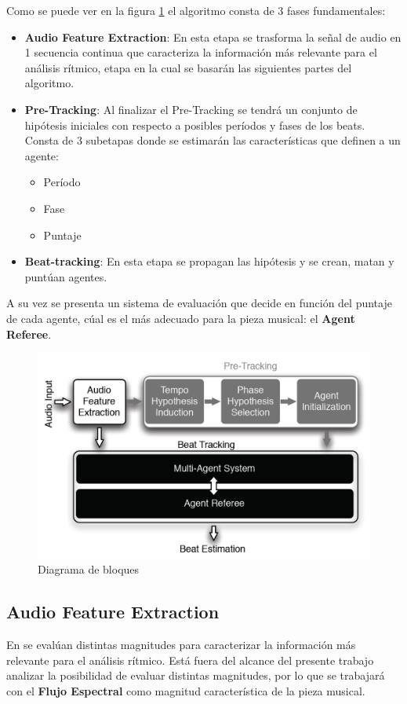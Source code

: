 \documentclass[12pt,a4paper,titlepage]{report}
\begin{document}
Como se puede ver en la figura \ref{fig:bloques} el algoritmo consta de 3 fases fundamentales:
\begin{itemize}
\item \textbf{Audio Feature Extraction}: En esta etapa se trasforma la señal de audio en 1 secuencia continua que caracteriza la información más relevante para el análisis rítmico, etapa en la cual se basarán las siguientes partes del algoritmo.
\item \textbf{Pre-Tracking}: Al finalizar el Pre-Tracking se tendrá un conjunto de hipótesis iniciales con respecto a posibles períodos y fases de los beats. Consta de 3 subetapas donde se estimarán las características que definen a un agente:
\begin{itemize}
\item Período
\item Fase
\item Puntaje
\end{itemize}
\item \textbf{Beat-tracking}: En esta etapa se propagan las hipótesis y se crean, matan y puntúan agentes.
\end{itemize}

A su vez se presenta un sistema de evaluación que decide en función del puntaje de cada agente, cúal es el más adecuado para la pieza musical: el \textbf{Agent Referee}.

\begin{figure}[h!]
\centering
\includegraphics[width=.6\linewidth]{./pics/bloques}
\caption{Diagrama de bloques}
\label{fig:bloques}
\end{figure}

\subsection{Audio Feature Extraction}
En \cite{bib:feature_extraction} se evalúan distintas magnitudes para caracterizar la información más relevante para el análisis rítmico. Está fuera del alcance del presente trabajo analizar la posibilidad de evaluar distintas magnitudes, por lo que se trabajará con el \textbf{Flujo Espectral} como magnitud característica de la pieza musical.\\
\end{document}
